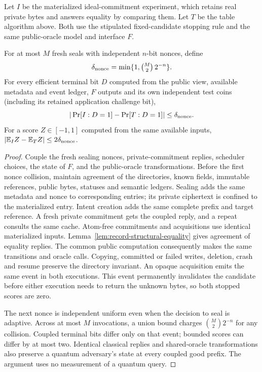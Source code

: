 Let $I$ be the materialized ideal-commitment experiment, which retains real
private bytes and answers equality by comparing them. Let $T$ be the table
algorithm above. Both use the stipulated fixed-candidate stopping rule and
the same public-oracle model and interface $F$.

\begin{theorem}
\label{thm:opaque-rendering}
For at most $M$ fresh seals with independent $n$-bit nonces, define
\[
 \delta_{\rm nonce}=\min\{1,\tbinom M2\,2^{-n}\}.
\]
For every efficient terminal bit $D$ computed from the public view, available
metadata and event ledger, $F$ outputs and its own independent test coins
(including its retained application challenge bit),
\[
  |\Pr[I:D=1]-\Pr[T:D=1]|\leq\delta_{\rm nonce}.
\]
For a score $Z\in[-1,1]$ computed from the same available inputs,
$|\mathbb E_I Z-\mathbb E_T Z|\leq2\delta_{\rm nonce}$.
\end{theorem}
\begin{proof}
Couple the fresh sealing nonces, private-commitment replies, scheduler choices,
the state of $F$, and the public-oracle transformations. Before the first
nonce collision, maintain agreement of the directories, known fields,
immutable references, public bytes, statuses and semantic ledgers.
Sealing adds the same metadata and nonce to corresponding entries; its
private ciphertext is confined to the materialized entry. Intent creation
adds the same complete prefix and target reference. A fresh private
commitment gets the coupled reply, and a repeat consults the same cache.
Atom-free commitments and acquisitions use identical materialized inputs.
Lemma~\ref{lem:record-structural-equality} gives agreement of equality replies.
The common public computation consequently makes the same transitions and
oracle calls. Copying, committed or failed writes, deletion, crash and
resume preserve the directory invariant. An opaque acquisition emits the
same event in both executions. This event permanently invalidates the
candidate before either execution needs to return the unknown bytes, so
both stopped scores are zero.

The next nonce is independent uniform even when the decision to seal is
adaptive. Across at most $M$ invocations, a union bound charges
$\binom M2 2^{-n}$ for any collision. Coupled terminal bits differ only on
that event; bounded scores can differ by at most two. Identical classical
replies and shared-oracle transformations also preserve a quantum
adversary's state at every coupled good prefix. The argument uses no
measurement of a quantum query.
\end{proof}

